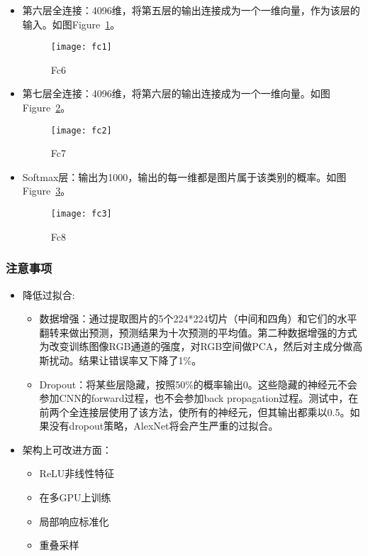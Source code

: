 \begin{itemize}
\item 第六层全连接：4096维，将第五层的输出连接成为一个一维向量，作为该层的输入。如图Figure~\ref{fig:fc6}。
	\begin{figure}[!ht]
	\centering
	\texttt{[image: fc1]}
	\caption{Fc6}
	\label{fig:fc6}
	\end{figure}
\item 第七层全连接：4096维，将第六层的输出连接成为一个一维向量。如图Figure~\ref{fig:fc7}。
	\begin{figure}[!ht]
	\centering
	\texttt{[image: fc2]}
	\caption{Fc7}
	\label{fig:fc7}
	\end{figure}
\item Softmax层：输出为1000，输出的每一维都是图片属于该类别的概率。如图Figure~\ref{fig:fc8}。
	\begin{figure}[!ht]
	\centering
	\texttt{[image: fc3]}
	\caption{Fc8}
	\label{fig:fc8}
	\end{figure}
\end{itemize}


\subsubsection{注意事项}
\begin{itemize}
\item 降低过拟合:
\begin{itemize}
\item 数据增强：通过提取图片的5个224*224切片（中间和四角）和它们的水平翻转来做出预测，预测结果为十次预测的平均值。第二种数据增强的方式为改变训练图像RGB通道的强度，对RGB空间做PCA，然后对主成分做高斯扰动。结果让错误率又下降了1\%。

\item Dropout：将某些层隐藏，按照50\%的概率输出0。这些隐藏的神经元不会参加CNN的forward过程，也不会参加back propagation过程。测试中，在前两个全连接层使用了该方法，使所有的神经元，但其输出都乘以0.5。如果没有dropout策略，AlexNet将会产生严重的过拟合。\newline
\end{itemize}

\item 架构上可改进方面：
\begin{itemize}
\item ReLU非线性特征 
\item 在多GPU上训练
\item 局部响应标准化
\item 重叠采样
\end{itemize}
\end{itemize}

